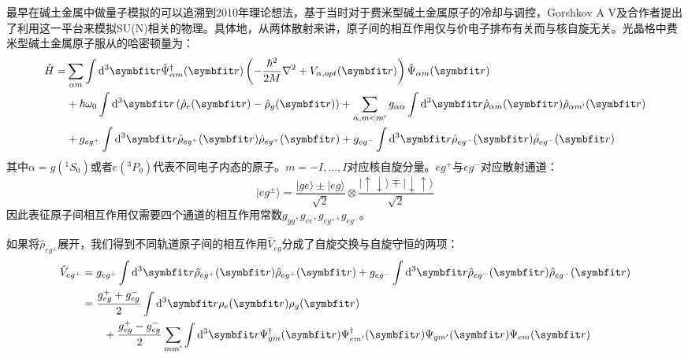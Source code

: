 最早在碱土金属中做量子模拟的可以追溯到2010年理论想法，基于当时对于费米型碱土金属原子的冷却与调控，Gorshkov A V\cite{gorshkov2010two}及合作者提出了利用这一平台来模拟SU(N)相关的物理。具体地，从两体散射来讲，原子间的相互作用仅与价电子排布有关而与核自旋无关。光晶格中费米型碱土金属原子服从的哈密顿量为：
\begin{equation}
\begin{aligned}
\hat{H}=& \sum_{\alpha m} \int \mathrm{d}^{3} \Vector{r} \hat{\Psi}_{\alpha m}^{\dagger}(\Vector{r})\left(-\frac{\hbar^{2}}{2 M} \nabla^{2}+V_{\alpha,opt}(\Vector{r})\right) \hat{\Psi}_{\alpha m}(\Vector{r}) \\
&+\hbar \omega_{0} \int \mathrm{d}^{3} \Vector{r}\left(\hat{\rho}_{e}(\Vector{r})-\hat{\rho}_{g}(\Vector{r})\right)+ \sum_{\alpha, m<m^{\prime}} g_{\alpha \alpha} \int \mathrm{d}^{3} \Vector{r} \hat{\rho}_{\alpha m}(\Vector{r}) \hat{\rho}_{\alpha m^{\prime}}(\Vector{r})  \\
&+ g_{e g^+} \int \mathrm{d}^{3} \Vector{r} \hat{\rho}_{eg^+}(\Vector{r}) \hat{\rho}_{eg^+}(\Vector{r})+g_{e g^-} \int \mathrm{d}^{3} \Vector{r} \hat{\rho}_{eg^-}(\Vector{r}) \hat{\rho}_{eg^-}(\Vector{r})\\
\end{aligned}
\end{equation}
其中$\alpha=g({^1S_0})$或者$e({}^3P_0)$代表不同电子内态的原子。$m=-I,...,I$对应核自旋分量。$eg^+$与$eg^-$对应散射通道：
\begin{equation}
|eg^{\pm}\rangle = \frac{|ge\rangle\pm|eg\rangle}{\sqrt{2}}\otimes\frac{|\uparrow\downarrow\rangle\mp|\downarrow\uparrow \rangle}{\sqrt{2}}
\end{equation}
因此表征原子间相互作用仅需要四个通道的相互作用常数$g_{gg},g_{ee},g_{eg^+},g_{eg^-}$。
\begin{comment}
如图~\ref{eg}~
\begin{figure}[!htbp]
    \centering
    \texttt{[image: eg.png]}
    \bicaption{光晶格中四个散射通道。摘自\cite{gorshkov2010two}}{Four scattering channels in optical lattice. Reprinted from \cite{gorshkov2010two}}
    \label{eg}
\end{figure}
\end{comment}
如果将$\hat{\rho}_{eg^\pm}$展开，我们得到不同轨道原子间的相互作用$\hat{V}_{eg}$分成了自旋交换与自旋守恒的两项：
\begin{equation}
\begin{aligned}
\hat{V}_{eg^+} &= g_{e g^+} \int \mathrm{d}^{3} \Vector{r} \hat{\rho}_{eg^+}(\Vector{r}) \hat{\rho}_{eg^+}(\Vector{r})+g_{e g^-} \int \mathrm{d}^{3} \Vector{r} \hat{\rho}_{eg^-}(\Vector{r}) \hat{\rho}_{eg^-}(\Vector{r})\\
\quad &= \frac{g_{e g}^{+}+g_{e g}^{-}}{2} \int \mathrm{d}^{3} \Vector{r} \rho_{e}(\Vector{r}) \rho_{g}(\Vector{r}) \\ 
&\quad \quad + \frac{g_{e g}^{+}-g_{e g}^{-}}{2} \sum_{m m^{\prime}} \int \mathrm{d}^{3} \Vector{r} \Psi_{g m}^{\dagger}(\Vector{r}) \Psi_{e m^{\prime}}^{\dagger}(\Vector{r}) \Psi_{g m^{\prime}}(\Vector{r}) \Psi_{e m}(\Vector{r})
\end{aligned}
\end{equation}
